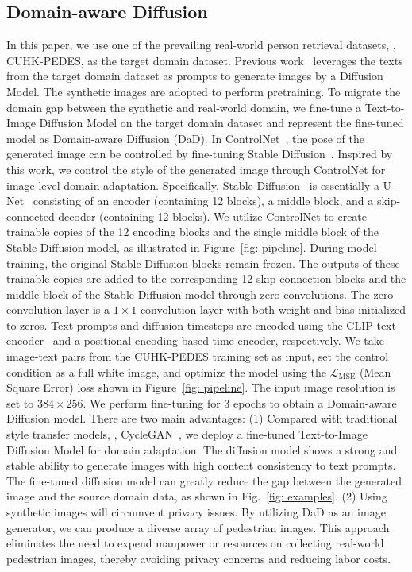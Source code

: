 \subsection{Domain-aware Diffusion} 
\noindent In this paper, we use one of the prevailing real-world person retrieval datasets, \ie, CUHK-PEDES, as the target domain dataset. Previous work~\cite{yang2023towards} leverages the texts from the target domain dataset as prompts to generate images by a Diffusion Model. The synthetic images are adopted to perform pretraining. 
To migrate the domain gap between the synthetic and real-world domain, we fine-tune a Text-to-Image Diffusion Model on the target domain dataset and represent the fine-tuned model as Domain-aware Diffusion (DaD). 
In ControlNet~\cite{zhang2023adding}, the pose of the generated image can be controlled by fine-tuning Stable Diffusion~\cite{sd15}. 
Inspired by this work, we control the style of the generated image through ControlNet for image-level domain adaptation. 
Specifically, Stable Diffusion~\cite{sd15} is essentially a U-Net~\cite{ronneberger2015u} consisting of an encoder (containing 12 blocks), a middle block, and a skip-connected decoder (containing 12 blocks). 
We utilize ControlNet to create trainable copies of the 12 encoding blocks and the single middle block of the Stable Diffusion model, as illustrated in Figure~\ref{fig: pipeline}. 
During model training, the original Stable Diffusion blocks remain frozen.
The outputs of these trainable copies are added to the corresponding 12 skip-connection blocks and the middle block of the Stable Diffusion model through zero convolutions. 
The zero convolution layer is a $1 \times 1$ convolution layer with both weight and bias initialized to zeros. 
Text prompts and diffusion timesteps are encoded using the CLIP text encoder~\cite{radford2021learning} and a positional encoding-based time encoder, respectively.
We take image-text pairs from the CUHK-PEDES training set as input, set the control condition as a full white image, and optimize the model using the $\mathcal{L}_{\text{MSE}}$ (Mean Square Error) loss shown in Figure~\ref{fig: pipeline}. 
The input image resolution is set to $384 \times 256$. 
We perform fine-tuning for 3 epochs to obtain a Domain-aware Diffusion model.
There are two main advantages:
(1) Compared with traditional style transfer models, \eg, CycleGAN~\cite{zhu2017unpaired}, we deploy a fine-tuned Text-to-Image Diffusion Model for domain adaptation. 
The diffusion model shows a strong and stable ability to generate images with high content consistency to text prompts. 
The fine-tuned diffusion model can greatly reduce the gap between the generated image and the source domain data, as shown in Fig.~\ref{fig: examples}.
(2) Using synthetic images will circumvent privacy issues. By utilizing DaD as an image generator, we can produce a diverse array of pedestrian images. This approach eliminates the need to expend manpower or resources on collecting real-world pedestrian images, thereby avoiding privacy concerns and reducing labor costs. 


